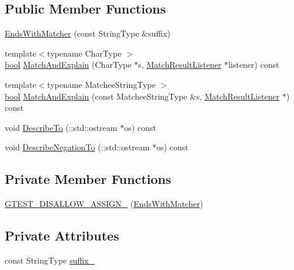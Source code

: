 \subsection*{Public Member Functions}
\begin{DoxyCompactItemize}
\item 
\hyperlink{classtesting_1_1internal_1_1EndsWithMatcher_a38726091c8767c2d8a15abf2a8c2018a}{Ends\+With\+Matcher} (const String\+Type \&suffix)
\item 
{\footnotesize template$<$typename Char\+Type $>$ }\\\hyperlink{classbool}{bool} \hyperlink{classtesting_1_1internal_1_1EndsWithMatcher_aadb9ad4734e0a3540b1674b1716c22e2}{Match\+And\+Explain} (Char\+Type $\ast$s, \hyperlink{classtesting_1_1MatchResultListener}{Match\+Result\+Listener} $\ast$listener) const
\item 
{\footnotesize template$<$typename Matchee\+String\+Type $>$ }\\\hyperlink{classbool}{bool} \hyperlink{classtesting_1_1internal_1_1EndsWithMatcher_a0d3b4f762a3172bb378671a9e6863891}{Match\+And\+Explain} (const Matchee\+String\+Type \&s, \hyperlink{classtesting_1_1MatchResultListener}{Match\+Result\+Listener} $\ast$) const
\item 
void \hyperlink{classtesting_1_1internal_1_1EndsWithMatcher_aec33451ab09428a97ab0793e332416d8}{Describe\+To} (\+::std\+::ostream $\ast$os) const
\item 
void \hyperlink{classtesting_1_1internal_1_1EndsWithMatcher_af5dd55c6c3a2ce57bd85f12e07cb604a}{Describe\+Negation\+To} (\+::std\+::ostream $\ast$os) const
\end{DoxyCompactItemize}
\subsection*{Private Member Functions}
\begin{DoxyCompactItemize}
\item 
\hyperlink{classtesting_1_1internal_1_1EndsWithMatcher_ac220c32e72e0dec1b9d65dc52241acd2}{G\+T\+E\+S\+T\+\_\+\+D\+I\+S\+A\+L\+L\+O\+W\+\_\+\+A\+S\+S\+I\+G\+N\+\_\+} (\hyperlink{classtesting_1_1internal_1_1EndsWithMatcher}{Ends\+With\+Matcher})
\end{DoxyCompactItemize}
\subsection*{Private Attributes}
\begin{DoxyCompactItemize}
\item 
const String\+Type \hyperlink{classtesting_1_1internal_1_1EndsWithMatcher_a66f75082cf1041cd328c01b47acf8350}{suffix\+\_\+}
\end{DoxyCompactItemize}



